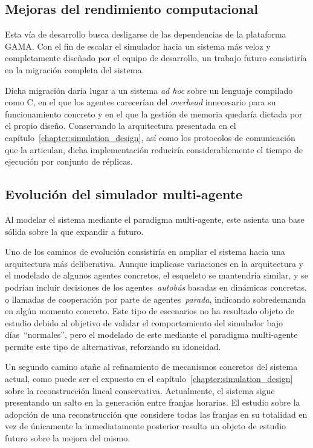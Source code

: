 \subsection{Mejoras del rendimiento computacional}
Esta vía de desarrollo busca desligarse de las dependencias de la plataforma GAMA. Con el fin
de escalar el simulador hacia un sistema más veloz y completamente diseñado por el equipo de
desarrollo, un trabajo futuro consistiría en la migración completa del sistema.

Dicha migración daría lugar a un sistema \textit{ad hoc} sobre un lenguaje compilado como C,
en el que los agentes carecerían del \textit{overhead} innecesario para su funcionamiento
concreto y en el que la gestión de memoria quedaría dictada por el propio diseño. Conservando
la arquitectura presentada en el capítulo~\ref{chapter:simulation_design}, así como los
protocolos de comunicación que la articulan, dicha implementación reduciría considerablemente
el tiempo de ejecución por conjunto de réplicas.


\subsection{Evolución del simulador multi-agente}
Al modelar el sistema mediante el paradigma multi-agente, este asienta una base sólida sobre la que expandir a futuro.

Uno de los caminos de evolución consistiría en ampliar el sistema hacia una arquitectura más deliberativa. Aunque implicase variaciones
en la arquitectura y el modelado de algunos agentes concretos, el esqueleto se mantendría similar, y se podrían incluir decisiones
de los agentes~\textit{autobús} basadas en dinámicas concretas, o llamadas de cooperación por parte de agentes~\textit{parada},
indicando sobredemanda en algún momento concreto. Este tipo de escenarios no ha resultado objeto de estudio debido al objetivo
de validar el comportamiento del simulador bajo días~\enquote{normales}, pero el modelado de este mediante el paradigma multi-agente
permite este tipo de alternativas, reforzando su idoneidad.

Un segundo camino atañe al refinamiento de mecanismos concretos del sistema actual, como puede ser el expuesto en el capítulo~\ref{chapter:simulation_design}
sobre la reconstrucción lineal conservativa. Actualmente, el sistema sigue presentando un salto en la generación entre franjas horarias.
El estudio sobre la adopción de una reconstrucción que considere todas las franjas en su totalidad en vez de únicamente la inmediatamente
posterior resulta un objeto de estudio futuro sobre la mejora del mismo.